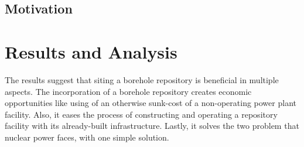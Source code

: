 \documentclass{anstrans}
\begin{document}
\subsection{Motivation}



\section{Results and Analysis}
The results suggest that siting a borehole repository is beneficial in multiple aspects. The incorporation of a borehole repository creates economic opportunities like using of an otherwise sunk-cost of a non-operating power plant facility. Also, it eases the process of constructing and operating a repository facility with its already-built infrastructure. Lastly, it solves the two problem that nuclear power faces, with one simple solution.
\end{document}
